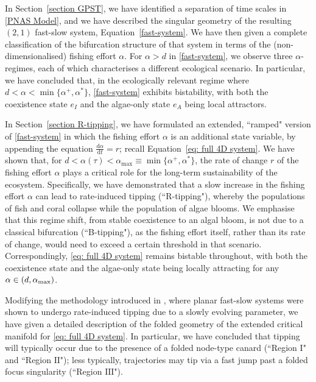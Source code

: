 \documentclass{article}
\theoremstyle{definition}
\numberwithin{equation}{section}
\newcommand{\dd}{\mathrm{d}}
\begin{document}
In Section~\ref{section GPST}, we have identified a separation of time scales in \eqref{PNAS Model}, and we have described the singular geometry of the resulting $(2,1)$ fast-slow system, Equation~\eqref{fast-system}. We have then given a complete classification of the bifurcation structure of that system in terms of the (non-dimensionalised) fishing effort $\alpha$. For $\alpha>d$ in \eqref{fast-system}, we observe three $\alpha$-regimes, each of which characterises a different ecological scenario. In particular, we have concluded that, in the ecologically relevant regime where $d<\alpha<\min\{\alpha^+,\alpha^{\ast}\}$, \eqref{fast-system} exhibits bistability, with both the coexistence state $e_I$ and the algae-only state $e_A$ being local attractors. 

In Section~\ref{section R-tipping}, we have formulated an extended, ``ramped" version of \eqref{fast-system} in which the fishing effort $\alpha$ is an additional state variable, by appending the equation $\frac{\dd \alpha}{\dd t}=r$; recall Equation~\eqref{eq: full 4D system}. We have shown that, for $d<\alpha(\tau)<\alpha_{\max}\equiv \min \{\alpha^+, \alpha^{\ast}\}$, the rate of change $r$ of the fishing effort $\alpha$ plays a critical role for the long-term sustainability of the ecosystem. Specifically, we have demonstrated that a slow increase in the fishing effort $\alpha$ can lead to rate-induced tipping (``R-tipping"), whereby the populations of fish and coral collapse while the population of algae blooms. We emphasise that this regime shift, from stable coexistence to an algal bloom, is not due to a classical bifurcation (``B-tipping"), as the fishing effort itself, rather than its rate of change, would need to exceed a certain threshold in that scenario. Correspondingly, \eqref{eq: full 4D system} remains bistable throughout, with both the coexistence state and the algae-only state being locally attracting for any $\alpha\in(d,\alpha_{\rm max})$. 

Modifying the methodology introduced in \cite{Plankton-tipping,vanselow_2019_when}, where  planar fast-slow systems were shown to undergo rate-induced tipping due to a slowly evolving parameter, we have given a detailed description of the folded geometry of the extended critical manifold for \eqref{eq: full 4D system}. In particular, we have concluded that tipping will typically occur due to the presence of a folded node-type canard (``Region $\mathrm{I}$" and ``Region $\mathrm{II}$"); less typically, trajectories may tip via a fast jump past a folded focus singularity (``Region $\mathrm{III}$").
\end{document}

